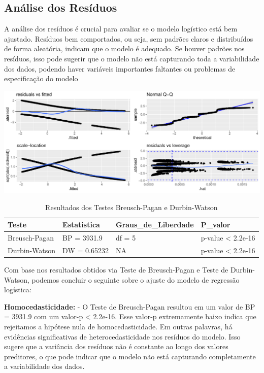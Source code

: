 \documentclass[
  letterpaper,
  DIV=11,
  numbers=noendperiod]{scrreprt}
\begin{document}
\subsection{Análise dos Resíduos}\label{anuxe1lise-dos-resuxedduos-2}

A análise dos resíduos é crucial para avaliar se o modelo logístico está
bem ajustado. Resíduos bem comportados, ou seja, sem padrões claros e
distribuídos de forma aleatória, indicam que o modelo é adequado. Se
houver padrões nos resíduos, isso pode sugerir que o modelo não está
capturando toda a variabilidade dos dados, podendo haver variáveis
importantes faltantes ou problemas de especificação do modelo

\includegraphics{trabalho_files/figure-pdf/unnamed-chunk-36-1.pdf}

\begin{longtable}[t]{llll}
\caption{\label{tab:unnamed-chunk-38}Resultados dos Testes Breusch-Pagan e Durbin-Watson}\\
\toprule
Teste & Estatistica & Graus\_de\_Liberdade & P\_valor\\
\midrule
Breusch-Pagan & BP = 3931.9 & df = 5 & p-value < 2.2e-16\\
Durbin-Watson & DW = 0.65232 & NA & p-value < 2.2e-16\\
\bottomrule
\end{longtable}

Com base nos resultados obtidos via Teste de Breusch-Pagan e Teste de
Durbin-Watson, podemos concluir o seguinte sobre o ajuste do modelo de
regressão logística:

\textbf{Homocedasticidade:} - O Teste de Breusch-Pagan resultou em um
valor de BP = 3931.9 com um valor-p \textless{} 2.2e-16. Esse valor-p
extremamente baixo indica que rejeitamos a hipótese nula de
homocedasticidade. Em outras palavras, há evidências significativas de
heterocedasticidade nos resíduos do modelo. Isso sugere que a variância
dos resíduos não é constante ao longo dos valores preditores, o que pode
indicar que o modelo não está capturando completamente a variabilidade
dos dados.
\end{document}
